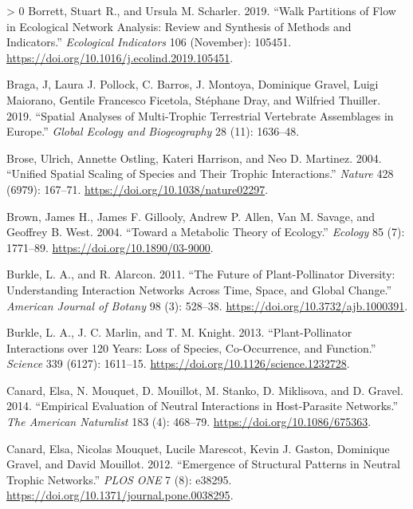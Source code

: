 \documentclass[10pt,oneside]{article}
\newlength{\cslhangindent}
\newenvironment{CSLReferences}[3] %
 {%
  \setlength{\parindent}{0pt}
  \ifodd #1 \everypar{\setlength{\hangindent}{\cslhangindent}}\ignorespaces\fi
  \ifnum #2 > 0
  \setlength{\parskip}{#2\baselineskip}
  \fi
 }%
 {}
\begin{document}
\begin{CSLReferences}{1}{0}
\leavevmode\hypertarget{ref-Borrett2019WalPar}{}%
Borrett, Stuart R., and Ursula M. Scharler. 2019. {``Walk Partitions of
Flow in Ecological Network Analysis: Review and Synthesis of Methods and
Indicators.''} \emph{Ecological Indicators} 106 (November): 105451.
\url{https://doi.org/10.1016/j.ecolind.2019.105451}.

\leavevmode\hypertarget{ref-Braga2019SpaAna}{}%
Braga, J, Laura J. Pollock, C. Barros, J. Montoya, Dominique Gravel,
Luigi Maiorano, Gentile Francesco Ficetola, Stéphane Dray, and Wilfried
Thuiller. 2019. {``Spatial Analyses of Multi-Trophic Terrestrial
Vertebrate Assemblages in Europe.''} \emph{Global Ecology and
Biogeography} 28 (11): 1636--48.

\leavevmode\hypertarget{ref-Brose2004UniSpa}{}%
Brose, Ulrich, Annette Ostling, Kateri Harrison, and Neo D. Martinez.
2004. {``Unified Spatial Scaling of Species and Their Trophic
Interactions.''} \emph{Nature} 428 (6979): 167--71.
\url{https://doi.org/10.1038/nature02297}.

\leavevmode\hypertarget{ref-Brown2004MetThe}{}%
Brown, James H., James F. Gillooly, Andrew P. Allen, Van M. Savage, and
Geoffrey B. West. 2004. {``Toward a Metabolic Theory of Ecology.''}
\emph{Ecology} 85 (7): 1771--89. \url{https://doi.org/10.1890/03-9000}.

\leavevmode\hypertarget{ref-Burkle2011FutPla}{}%
Burkle, L. A., and R. Alarcon. 2011. {``The Future of Plant-Pollinator
Diversity: Understanding Interaction Networks Across Time, Space, and
Global Change.''} \emph{American Journal of Botany} 98 (3): 528--38.
\url{https://doi.org/10.3732/ajb.1000391}.

\leavevmode\hypertarget{ref-Burkle2013PlaInt}{}%
Burkle, L. A., J. C. Marlin, and T. M. Knight. 2013. {``Plant-Pollinator
Interactions over 120 Years: Loss of Species, Co-Occurrence, and
Function.''} \emph{Science} 339 (6127): 1611--15.
\url{https://doi.org/10.1126/science.1232728}.

\leavevmode\hypertarget{ref-Canard2014EmpEva}{}%
Canard, Elsa, N. Mouquet, D. Mouillot, M. Stanko, D. Miklisova, and D.
Gravel. 2014. {``Empirical Evaluation of Neutral Interactions in
Host-Parasite Networks.''} \emph{The American Naturalist} 183 (4):
468--79. \url{https://doi.org/10.1086/675363}.

\leavevmode\hypertarget{ref-Canard2012EmeStr}{}%
Canard, Elsa, Nicolas Mouquet, Lucile Marescot, Kevin J. Gaston,
Dominique Gravel, and David Mouillot. 2012. {``Emergence of Structural
Patterns in Neutral Trophic Networks.''} \emph{PLOS ONE} 7 (8): e38295.
\url{https://doi.org/10.1371/journal.pone.0038295}.


\end{CSLReferences}
\end{document}
